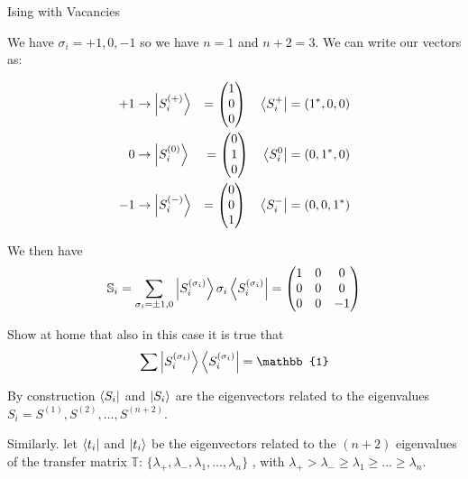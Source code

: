 \documentclass[../../Main/Main.tex]{subfiles}
\begin{document}
\begin{example}{Ising with Vacancies}{}

We have $\sigma_{i} = +1,0,-1$ so we have $n=1$ and $n+2 = 3$.
We can write our vectors as:

\begin{align}
+&1 \to \ket{S_{i}^{(+)}}  &= \begin{pmatrix}
1 \\
0 \\
0
\end{pmatrix}\quad  \bra{S_{i}^{+}} = (1^{*},0,0) \\
&0 \to \ket{S_{i}^{(0)}}  &= \begin{pmatrix}
0 \\
1 \\
0
\end{pmatrix}  \quad \bra{S_{i}^{0}} = (0,1^{*},0)\\
-&1 \to \ket{S_{i}^{(-)}}  &= \begin{pmatrix}
0 \\
0 \\
1
\end{pmatrix} \quad \bra{S_{i}^{-}} = (0,0,1^{*})\\
\end{align}


We then have
$$\mathbb{S}_{i} = \sum_{\sigma_{i} = \pm 1,0} \ket{S_{i}^{(\sigma_{i})}} \sigma_{i}\bra{S_{i}^{(\sigma_{i})}} = \begin{pmatrix}
1 & 0 & 0 \\
0 & 0 & 0 \\
0 & 0 & -1
\end{pmatrix} $$

Show at home that also in this case it is true that
$$\sum \ket{S_{i}^{(\sigma_{i})}} \bra{S_{i}^{(\sigma_{i})}} = \mathbb{1}$$

\end{example}



\begin{remark}
By construction \( \bra{S_i}  \) and \( \ket{S_i}  \) are the eigenvectors related to the eigenvalues \( S_i = S^{(1)},S^{(2)}, \dots,S^{(n+2)} \).
\end{remark}
Similarly. let \( \bra{t_i}  \) and \( \ket{t_i}  \) be the eigenvectors related to the \( (n+2) \) eigenvalues of the transfer matrix \( \mathbb{T} \):
   \( \{ \lambda _+,\lambda _-,\lambda _1,\dots,\lambda _n  \}   \) , with \( \lambda _+ > \lambda _- \ge \lambda _1 \ge \dots \ge \lambda _n \).
\end{document}
